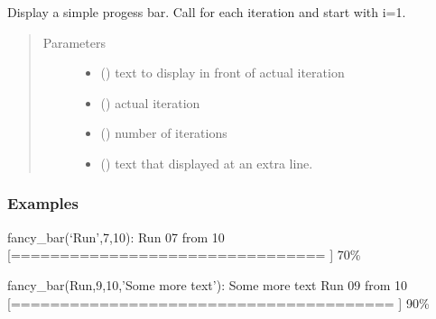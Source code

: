 \documentclass[letterpaper,10pt,english,openany,oneside]{sphinxmanual}
\begin{document}
\begin{fulllineitems}
\label{\detokenize{pygpc:pygpc.misc.display_fancy_bar}}
Display a simple progess bar.
Call for each iteration and start with i=1.
\begin{quote}\begin{description}
\item[{Parameters}] \leavevmode\begin{itemize}
\item {} 
 () \textendash{} text to display in front of actual iteration

\item {} 
 () \textendash{} actual iteration

\item {} 
 () \textendash{} number of iterations

\item {} 
 (\sphinxstyleliteralemphasis{\sphinxupquote{, }}\sphinxstyleliteralemphasis{\sphinxupquote{, }}) \textendash{} text that displayed at an extra line.

\end{itemize}

\end{description}\end{quote}
\subsubsection*{Examples}

fancy\_bar(‘Run’,7,10):
Run 07 from 10 {[}================================        {]} 70\%

fancy\_bar(Run,9,10,’Some more text’):
Some more text
Run 09 from 10 {[}======================================= {]} 90\%

\end{fulllineitems}
\end{document}

